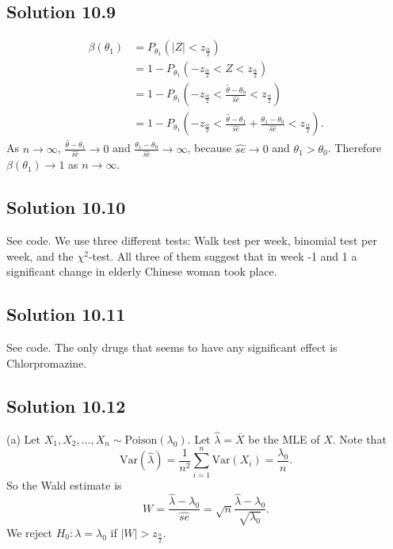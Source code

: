 \subsection*{Solution 10.9}
\begin{equation*}
\begin{split}
\beta(\theta_1) &= P_{\theta_1}(|Z| < z_{\frac{\alpha}{2}}) \\
    &= 1 - P_{\theta_1}(-z_{\frac{\alpha}{2}} < Z < z_{\frac{\alpha}{2}}) \\
    &= 1 - P_{\theta_1}\left(-z_{\frac{\alpha}{2}} < \frac{\hat{\theta} - \theta_0}{\hat{se}} < z_{\frac{\alpha}{2}}\right) \\
    &= 1 - P_{\theta_1}\left(-z_{\frac{\alpha}{2}} < \frac{\hat{\theta} - \theta_1}{\hat{se}} + \frac{\theta_1 - \theta_0}{\hat{se}} < z_{\frac{\alpha}{2}}\right).
\end{split}
\end{equation*}
As $n \to \infty$, $\frac{\hat{\theta} - \theta_1}{\hat{se}} \to 0$ and $\frac{\theta_1 - \theta_0}{\hat{se}} \to \infty$, because $\hat{se} \to 0$ and $\theta_1 > \theta_0$.
Therefore $\beta(\theta_1) \to 1$ as $n \to \infty$.


\subsection*{Solution 10.10}

See code.
We use three different tests: Walk test per week, binomial test per week, and the $\chi^2$-test.
All three of them suggest that in week -1 and 1 a significant change in elderly Chinese woman took place.


\subsection*{Solution 10.11}

See code.
The only drugs that seems to have any significant effect is Chlorpromazine.


\subsection*{Solution 10.12}

(a) Let $X_1, X_2, ..., X_n \sim \mathrm{Poison}(\lambda_0)$.
Let $\hat{\lambda} = \overline{X}$ be the MLE of $X$.
Note that
$$
\mathrm{Var}(\hat{\lambda}) = \frac{1}{n^2} \sum_{i=1}^n \mathrm{Var}(X_i) = \frac{\lambda_0}{n}.
$$
So the Wald estimate is
$$
W = \frac{\hat{\lambda} - \lambda_0}{\hat{se}} = \sqrt{n} \frac{\hat{\lambda} - \lambda_0}{\sqrt{\lambda_0}}.
$$
We reject $H_0: \lambda = \lambda_0$ if $|W| > z_{\frac{\alpha}{2}}$.

